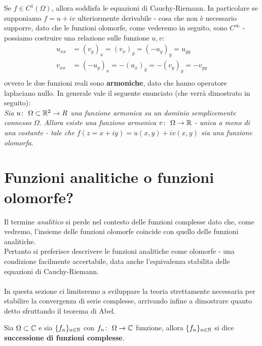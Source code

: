\begin{remark}
	Se $f \in C^1(\Omega)$, allora soddisfa le equazioni di Cauchy-Riemann. In particolare se supponiamo $f = u+iv$ ulteriormente derivabile - cosa che non è necessario supporre, dato che le funzioni olomorfe, come vederemo in seguito, sono $C^\infty$ - possiamo costruire una relazione sulle funzione $u,v$:
	\begin{equation*}
	\begin{aligned}	
		u_{xx} & = (v_y)_x = (v_x)_y = (-u_y)_y = u_{yy} \\
		v_{xx} & = (-u_y)_x = -(u_x)_y = -(v_y)_y = -v_{yy}\\
	\end{aligned}
	\end{equation*}
	ovvero le due funzioni reali sono \textbf{armoniche}, dato che hanno operatore laplaciano nullo. In generale vale il seguente enunciato (che verrà dimostrato in seguito):\\
	
	\textit{Sia $u \colon\ \Omega \subset \mathbb{R}^2 \rightarrow R$ una funzione armonica su un dominio semplicemente connesso $\Omega$. Allora esiste una funzione armonica $v \colon\ \Omega \rightarrow \mathbb{R}$ - unica a meno di una costante - tale che $f(z=x+iy) = u(x,y) + iv(x,y)$ sia una funzione olomorfa}.
\end{remark}		
	
\section{Funzioni analitiche o funzioni olomorfe?}

Il termine \textit{analitico} si perde nel contesto delle funzioni complesse dato che, come vedremo, l'insieme delle funzioni olomorfe coincide con quello delle funzioni analitiche. \\ Pertanto si preferisce descrivere le funzioni analitiche come olomorfe - una condizione facilmente accertabile, data anche l'equivalenza stabilita delle equazioni di Cauchy-Riemann. \\ \\ In questa sezione ci limiteremo a sviluppare la teoria strettamente necessaria per stabilire la convergenza di serie complesse, arrivando infine a dimostrare quanto detto sfruttando il teorema di Abel.\\

\begin{definition}
	\label{defn:successione-di-funzioni-complesse}
	Sia $\Omega \subset \mathbb{C}$ e sia $\{f_n\}_{n\in\mathbb{N}}$ con $f_n \colon\ \Omega \rightarrow \mathbb{C}$ funzione, allora $\{f_n\}_{n\in\mathbb{N}}$ si dice \textbf{successione di funzioni complesse}.
\end{definition}

